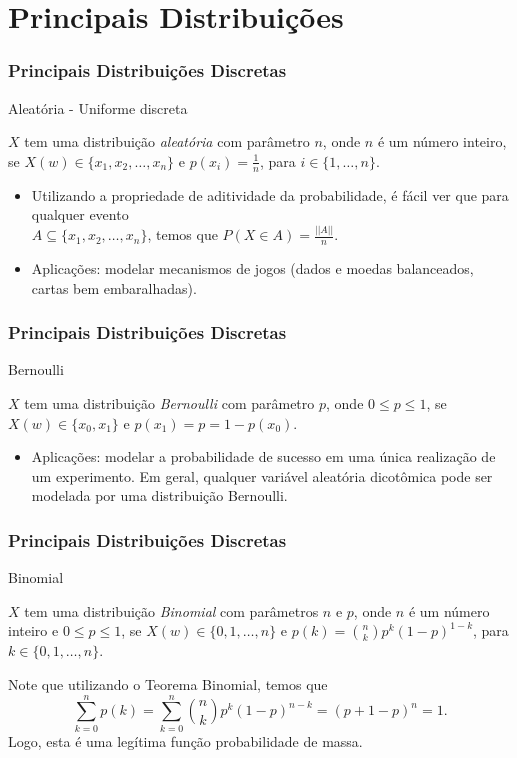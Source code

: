 \section{Principais Distribuições}
\begin{frame}
\frametitle{\textbf{Principais Distribuições Discretas}}
\baselineskip=13pt
\begin{block}{Aleatória - Uniforme discreta}

$X$ tem uma distribuição {\em
aleatória} com parâmetro $n$, onde $n$ é um número inteiro, se
$X(w)\in \{x_1,x_2,\ldots,x_n\}$ e $p(x_i)=\frac{1}{n}$, para
$i\in\{1,\ldots,n\}$.
\begin{itemize}
\item Utilizando a propriedade de aditividade da
probabilidade, é fácil ver que para qualquer evento\\ $A\subseteq
\{x_1,x_2,\ldots,x_n\}$, temos que $P(X\in A)=\frac{||A||}{n}$.

\item Aplicações: modelar
mecanismos de jogos (dados e moedas balanceados, cartas
bem embaralhadas).
\end{itemize}

\end{block}
\end{frame}

\begin{frame}
\frametitle{\textbf{Principais Distribuições  Discretas}}
\baselineskip=13pt
\begin{block}{Bernoulli}

$X$ tem uma distribuição {\em
Bernoulli} com parâmetro $p$, onde $0\leq p\leq 1$, se $X(w)\in
\{x_0,x_1\}$ e $p(x_1)=p=1-p(x_0)$.


\begin{itemize}
\item Aplicações: modelar
a probabilidade de sucesso em uma única realização de um
experimento. Em geral, qualquer variável aleatória dicotômica pode ser modelada por uma distribuição Bernoulli.
\end{itemize}

\end{block}
\end{frame}

\begin{frame}
\frametitle{\textbf{Principais Distribuições Discretas}}
\baselineskip=13pt
\begin{block}{Binomial}

$X$ tem uma distribuição {\em
Binomial} com parâmetros $n$ e $p$, onde $n$ é um número inteiro e
$0\leq p\leq 1$, se $X(w)\in \{0,1,\ldots,n\}$ e
$p(k)=\binom{n}{k}p^k(1-p)^{1-k}$, para $k\in\{0,1,\ldots,n\}$.

Note que utilizando o Teorema Binomial, temos que
$$\sum_{k=0}^{n}p(k)=\sum_{k=0}^{n}\binom{n}{k}p^k(1-p)^{n-k}=(p+1-p)^n=1.$$
Logo, esta é uma legítima função probabilidade de massa.

\end{block}
\end{frame}

